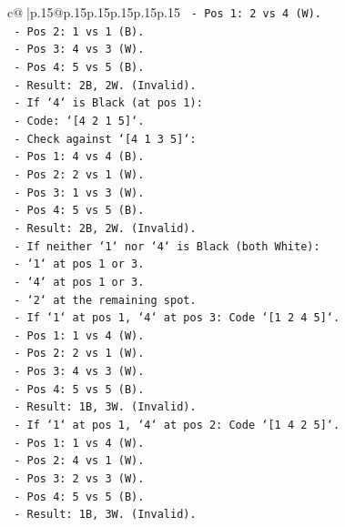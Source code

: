 \documentclass{article}
\begin{document}
{\begin{supertabular}{c@{$\;$}|p{.15\linewidth}@{}p{.15\linewidth}p{.15\linewidth}p{.15\linewidth}p{.15\linewidth}p{.15\linewidth}}
{{{\texttt{            {-} Pos 1: 2 vs 4 (W).} \\
\texttt{            {-} Pos 2: 1 vs 1 (B).} \\
\texttt{            {-} Pos 3: 4 vs 3 (W).} \\
\texttt{            {-} Pos 4: 5 vs 5 (B).} \\
\texttt{            {-} Result: 2B, 2W. (Invalid).} \\
\texttt{    {-} If `4` is Black (at pos 1):} \\
\texttt{        {-} Code: `{[}4 2 1 5{]}`.} \\
\texttt{        {-} Check against `{[}4 1 3 5{]}`:} \\
\texttt{            {-} Pos 1: 4 vs 4 (B).} \\
\texttt{            {-} Pos 2: 2 vs 1 (W).} \\
\texttt{            {-} Pos 3: 1 vs 3 (W).} \\
\texttt{            {-} Pos 4: 5 vs 5 (B).} \\
\texttt{            {-} Result: 2B, 2W. (Invalid).} \\
\texttt{    {-} If neither `1` nor `4` is Black (both White):} \\
\texttt{        {-} `1` at pos 1 or 3.} \\
\texttt{        {-} `4` at pos 1 or 3.} \\
\texttt{        {-} `2` at the remaining spot.} \\
\texttt{        {-} If `1` at pos 1, `4` at pos 3: Code `{[}1 2 4 5{]}`.} \\
\texttt{            {-} Pos 1: 1 vs 4 (W).} \\
\texttt{            {-} Pos 2: 2 vs 1 (W).} \\
\texttt{            {-} Pos 3: 4 vs 3 (W).} \\
\texttt{            {-} Pos 4: 5 vs 5 (B).} \\
\texttt{            {-} Result: 1B, 3W. (Invalid).} \\
\texttt{        {-} If `1` at pos 1, `4` at pos 2: Code `{[}1 4 2 5{]}`.} \\
\texttt{            {-} Pos 1: 1 vs 4 (W).} \\
\texttt{            {-} Pos 2: 4 vs 1 (W).} \\
\texttt{            {-} Pos 3: 2 vs 3 (W).} \\
\texttt{            {-} Pos 4: 5 vs 5 (B).} \\
\texttt{            {-} Result: 1B, 3W. (Invalid).} \\
}}}
\end{supertabular}}
\end{document}
